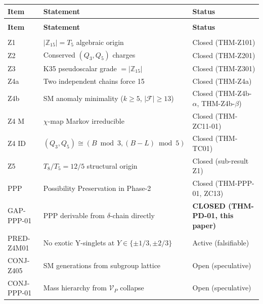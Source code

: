 \documentclass[12pt, a4paper]{article}
\begin{document}
\begin{derivedbox}[title={Z-Programme Status after TASK-ZC14}]
{\small
\renewcommand{\arraystretch}{1.30}
\begin{longtable}{>{\centering\arraybackslash}p{2.2cm}
                  >{\raggedright\arraybackslash}p{7.0cm}
                  >{\raggedright\arraybackslash}p{3.2cm}}
\toprule
\textbf{Item} & \textbf{Statement} & \textbf{Status} \\
\midrule
\endfirsthead
\multicolumn{3}{l}{\small\textit{(continued)}} \\[4pt]
\toprule
\textbf{Item} & \textbf{Statement} & \textbf{Status} \\
\midrule
\endhead
\midrule
\multicolumn{3}{r}{\small\textit{(continues)}} \\
\endfoot
\bottomrule
\endlastfoot
Z1        & $|\mathbb{Z}_{15}|=T_5$ algebraic origin
           & Closed (THM-Z101) \\
Z2        & Conserved $(Q_3,Q_5)$ charges
           & Closed (THM-Z201) \\
Z3        & K35 pseudoscalar grade $=|\mathbb{Z}_{15}|$
           & Closed (THM-Z301) \\
Z4a       & Two independent chains force 15
           & Closed (THM-Z4a) \\
Z4b       & SM anomaly minimality ($k\geq5$, $|\mathcal{F}|\geq13$)
           & Closed (THM-Z4b-$\alpha$, THM-Z4b-$\beta$) \\
Z4 M      & $\chi$-map Markov irreducible
           & Closed (THM-ZC11-01) \\
Z4 ID     & $(Q_3,Q_5)\cong(B\bmod3,(B-L)\bmod5)$
           & Closed (THM-TC01) \\
Z5        & $T_8/T_5=12/5$ structural origin
           & Closed (sub-result Z1) \\
PPP       & Possibility Preservation in Phase-2
           & Closed (THM-PPP-01, ZC13) \\
GAP-PPP-01 & PPP derivable from $\delta$-chain directly
           & \textbf{CLOSED (THM-PD-01, this paper)} \\
\midrule
PRED-Z4M01 & No exotic Y-singlets at $Y\in\{\pm1/3,\pm2/3\}$
           & Active (falsifiable) \\
CONJ-Z405  & 3 SM generations from subgroup lattice
           & Open (speculative) \\
CONJ-PPP-01 & Mass hierarchy from $\mathcal{V}_P$ collapse
           & Open (speculative) \\
\end{longtable}
}
\end{derivedbox}
\end{document}
